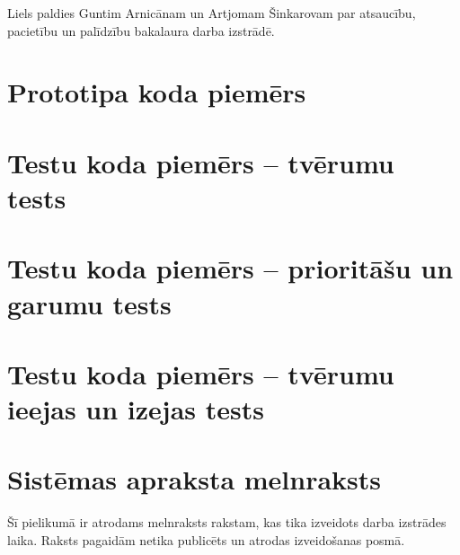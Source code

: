 \documentclass[12pt, a4paper]{article}
\begin{document}
Liels paldies Guntim Arnicānam un Artjomam Šinkarovam par atsaucību, pacietību un palīdzību bakalaura darba izstrādē.

{}


\appendixtitleon
\appendixtitletocon

\begin{appendices}

\newcommand{\ap}[1]{\section{#1}}
\renewcommand\thesection{\arabic{section}}

\ap{Prototipa koda piemērs}
\label{ap:code_sample}



\ap{Testu koda piemērs -- tvērumu tests}
\label{ap:test1_sample}



\ap{Testu koda piemērs -- prioritāšu un garumu tests}
\label{ap:test2_sample}



\ap{Testu koda piemērs -- tvērumu ieejas un izejas tests}
\label{ap:test3_sample}



\ap{Sistēmas apraksta melnraksts}
\label{ap:draft}

Šī pielikumā ir atrodams melnraksts rakstam, kas tika izveidots darba izstrādes laika. Raksts pagaidām netika publicēts un atrodas izveidošanas posmā.



\end{appendices}

\reglapa
\end{document}
